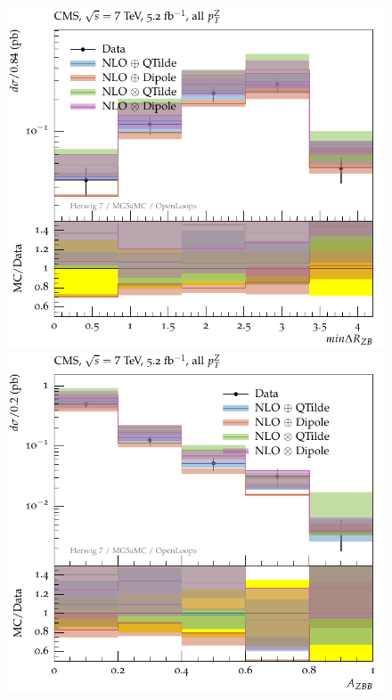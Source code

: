 \documentclass[11pt]{cernrep}
\begin{document}
\begin{figure}[htbp]
   \includegraphics[scale=0.65]{figs/zbb/herwigzbb/cms-d03-x01-y01.pdf} 
   \includegraphics[scale=0.65]{figs/zbb/herwigzbb/cms-d04-x01-y01.pdf} 

\end{figure}
\end{document}
